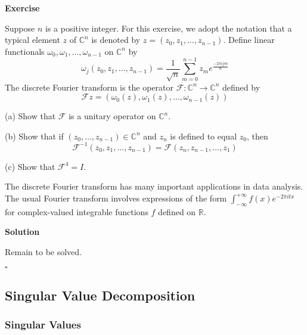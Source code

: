 \documentclass{article}
\newenvironment{exercise}{%
{\textbf{Exercise\\}
    }
}{
}
\newenvironment{solution}{%
{
    \textbf{Solution\\}
    }
}{
  \hfill $\square$ 
  \par\bigskip 
}
\newcommand{\RR}{\mathbb{R}}
\newcommand{\CC}{\mathbb{C}}
\newcommand{\parameter}[1]{\left(#1\right)}
\begin{document}
\begin{CJK}{UTF8}{gkai}
\begin{exercise}
    Suppose $n$ is a positive integer. For this exercise, we adopt the notation that a typical element $z$ of $\CC^n$ is denoted by $z = (z_0,z_1,\ldots,z_{n-1})$. Define linear functionals $\omega_0,\omega_1,\ldots,\omega_{n-1}$ on $\CC^n$ by
    \[\omega_j(z_0, z_1, \ldots,z_{n-1}) = \dfrac{1}{\sqrt{n}}\sum_{m = 0}^{n - 1} z_m e^{\frac{-2\pi i j m}{n}}\]
    The discrete Fourier transform is the operator $\mathcal{F}: \CC^n \to \CC^n$ defined by 
    \[\mathcal{F}z =(\omega_0(z),\omega_1(z),\ldots,\omega_{n-1}(z))\]

    (a) Show that $\mathcal{F}$ is a unitary operator on $\CC^n$.

    (b) Show that if $(z_0,\ldots,z_{n-1}) \in \CC^n$ and $z_n$ is defined to equal $z_0$, then
    \[\mathcal{F}^{-1}(z_0,z_1,\ldots,z_{n - 1}) = \mathcal{F}(z_n,z_{n - 1},\ldots,z_1)\]

    (c) Show that $\mathcal{F}^4 = I$.

    The discrete Fourier transform has many important applications in data analysis. The usual Fourier transform involves expressions of the form $\int_{-\infty}^{+\infty} f(x) e^{-2\pi i t x}$ for complex-valued integrable functions $f$ defined on $\RR$.
\end{exercise}

\begin{solution}
    Remain to be solved.

\end{solution}

\subsection{Singular Value Decomposition}

\subsubsection{Singular Values}


\end{CJK}
\end{document}
